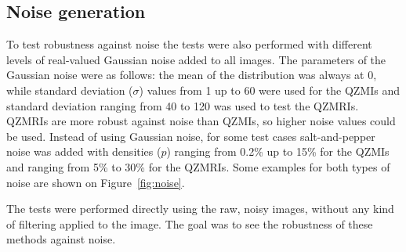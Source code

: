 \subsection{Noise generation}
To test robustness against noise the tests were also performed with different levels of real-valued Gaussian noise added to all images. The parameters of the Gaussian noise were as follows: the mean of the distribution was always at 0, while standard deviation ($\sigma$) values from 1 up to 60 were used for the QZMIs and standard deviation ranging from 40 to 120 was used to test the QZMRIs. QZMRIs are more robust against noise than QZMIs, so higher noise values could be used.
Instead of using Gaussian noise, for some test cases salt-and-pepper noise was added with densities ($p$) ranging from 0.2\% up to 15\% for the QZMIs and ranging from 5\% to 30\% for the QZMRIs. Some examples for both types of noise are shown on Figure~\ref{fig:noise}.


The tests were performed directly using the raw, noisy images, without any kind of filtering applied to the image. The goal was to see the robustness of these methods against noise. 

